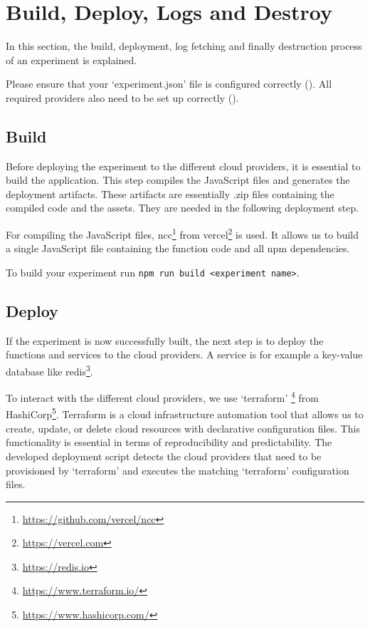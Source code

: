 \documentclass[../main.tex]{subfiles}
\begin{document}
\section{Build, Deploy, Logs and Destroy}\label{sec:builddeploylogsanddestroy}
In this section, the build, deployment, log fetching and finally destruction process of an experiment is explained.

Please ensure that your `experiment.json' file is configured correctly (). 
All required providers also need to be set up correctly ().

\subsection{Build}\label{sec:build}
Before deploying the experiment to the different cloud providers, 
it is essential to build the application. 
This step compiles the JavaScript files and generates the deployment artifacts. 
These artifacts are essentially .zip files containing the compiled code and the assets. 
They are needed in the following deployment step. 

For compiling the JavaScript files, ncc\footnote{\url{https://github.com/vercel/ncc}} 
from vercel\footnote{\url{https://vercel.com}} is used.
It allows us to build a single JavaScript file containing the function code and all npm dependencies.

To build your experiment run \texttt{npm run build <experiment name>}.

\subsection{Deploy}\label{sec:deploy}
If the experiment is now successfully built, 
the next step is to deploy the functions and services to the cloud providers. 
A service is for example a key-value database like redis\footnote{\url{https://redis.io}}. 

To interact with the different cloud providers, we use `terraform'%
\footnote{\url{https://www.terraform.io/}} from HashiCorp\footnote{\url{https://www.hashicorp.com/}}. 
Terraform is a cloud infrastructure automation tool that allows us to create, 
update, or delete cloud resources with declarative configuration files. 
This functionality is essential in terms of reproducibility and predictability.
The developed deployment script detects the cloud providers that need to be provisioned by `terraform'
and executes the matching `terraform' configuration files.
\end{document}

